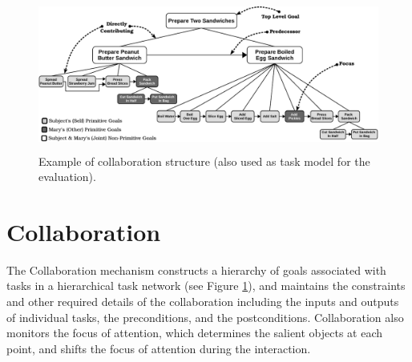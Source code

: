 \documentclass{aamas2016_extendedabstract}
\begin{document}
\begin{figure}
  \centering
  \vspace*{-5mm}
  \includegraphics[width=14.3cm,height=5.0cm]{figure/taskModel-croped.pdf}
  \vspace*{-3mm}
  \caption{Example of collaboration structure (also used as task model for
  the evaluation).}
  \label{fig:taskModel}
  \vspace*{-5mm}
\end{figure}

\vspace*{-3mm}
\section{Collaboration}

The Collaboration mechanism constructs a hierarchy of goals associated with
tasks in a hierarchical task network (see Figure \ref{fig:taskModel}), and
maintains the constraints and other required details of the collaboration
including the inputs and outputs of individual tasks, the preconditions, and the
postconditions. Collaboration also monitors the focus of attention, which
determines the salient objects at each point, and shifts the focus of attention
during the interaction.
\end{document}
